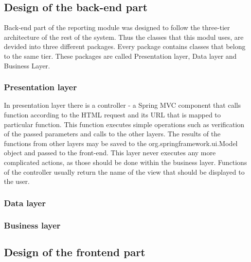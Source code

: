 \documentclass[thesis=B,english]{FITthesis}[2012/10/20]
\begin{document}


\subsection{Design of the back-end part}
Back-end part of the reporting module was designed to follow the three-tier architecture of the rest of the system. Thus the classes that this modul uses, are devided into three different packages. Every package contains classes that belong to the same tier. These packages are called Presentation layer, Data layer and Business Layer.

\subsubsection{Presentation layer}
In presentation layer there is a controller - a Spring MVC component that calls function according to the  HTML request and its URL that is mapped to particular function. This function executes simple operations such as verification of the passed parameters and calls to the other layers. The results of the functions from other layers may be saved to the org.springframework.ui.Model object and passed to the front-end. This layer never executes any more complicated actions, as those should be done within the business layer. Functions of the controller usually return the name of the view that should be displayed to the user.
\subsubsection{Data layer}
\subsubsection{Business layer}
\subsection{Design of the frontend part}
\end{document}
